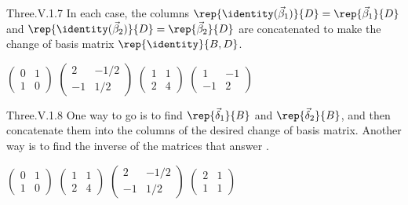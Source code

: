 \begin{ans}{Three.V.1.7}
      In each case, the columns
      $\rep{\identity(\vec{\beta}_1)}{D}=\rep{\vec{\beta}_1}{D}$
      and $\rep{\identity(\vec{\beta}_2)}{D}=\rep{\vec{\beta}_2}{D}$
      are concatenated to make the change of basis matrix
      $\rep{\identity}{B,D}$.
      \begin{exparts*}
        \partsitem \( \begin{pmatrix}
                   0  &1  \\
                   1  &0
                 \end{pmatrix} \)
        \partsitem \( \begin{pmatrix}
                   2  &-1/2  \\
                   -1 &1/2
                 \end{pmatrix} \)
        \partsitem \( \begin{pmatrix}
                   1  &1     \\
                   2  &4
                 \end{pmatrix} \)
        \partsitem \( \begin{pmatrix}
                   1  &-1    \\
                  -1  &2
                 \end{pmatrix} \)
      \end{exparts*}
    
\end{ans}
\begin{ans}{Three.V.1.8}
       One way to go is to find
       $\rep{\vec{\delta}_1}{B}$ and $\rep{\vec{\delta}_2}{B}$,
       and then concatenate them into the columns of the desired
       change of basis matrix.
       Another way is to find the inverse of the matrices that answer
       .
       \begin{exparts*}
        \partsitem
          $\begin{pmatrix}
            0  &1  \\
            1  &0
          \end{pmatrix}$
        \partsitem \( \begin{pmatrix}
            1  &1  \\
            2  &4
          \end{pmatrix} \)
        \partsitem \( \begin{pmatrix}
            2  &-1/2  \\
            -1 &1/2
          \end{pmatrix} \)
        \partsitem \( \begin{pmatrix}
            2  &1  \\
            1  &1
          \end{pmatrix} \)
      \end{exparts*}
    
\end{ans}
